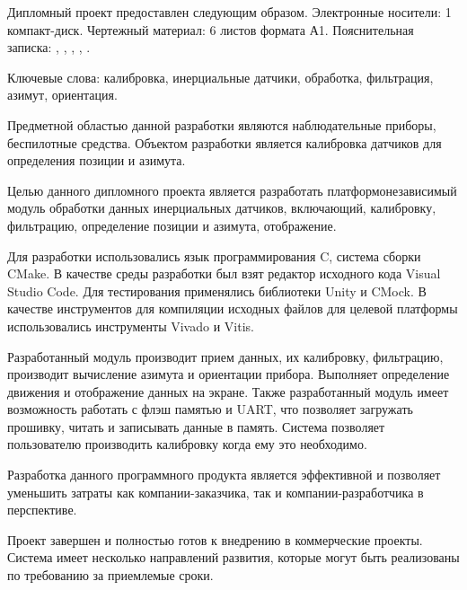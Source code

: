 
Дипломный проект предоставлен следующим образом. Электронные носители: 1
компакт-диск. Чертежный материал: 6 листов формата А1. Пояснительная записка:
\insertNumPagesText ,
\insertNumFiguresText , \insertNumTablesText ,
\insertNumBibElementsText ,
\insertNumAnnexesText .

Ключевые слова: калибровка, инерциальные датчики, обработка, фильтрация, азимут, ориентация.

Предметной областью данной разработки являются наблюдательные приборы, беспилотные средства.
Объектом разработки является калибровка датчиков для определения позиции и азимута.

Целью данного дипломного проекта является разработать платформонезависимый модуль обработки данных инерциальных датчиков, включающий, калибровку, фильтрацию, определение позиции и азимута, отображение.

Для разработки использовались язык программирования C,
система сборки CMake.
В качестве среды разработки
был взят редактор исходного кода Visual Studio Code.
Для тестирования применялись библиотеки Unity и CMock.
В качестве инструментов для компиляции исходных файлов для целевой платформы использовались инструменты Vivado и Vitis.

Разработанный модуль производит прием данных, их калибровку, фильтрацию,
производит вычисление азимута и ориентации прибора. Выполняет определение
движения и отображение данных на экране. Также разработанный модуль имеет
возможность работать с флэш памятью и UART, что позволяет загружать прошивку, читать
и записывать данные в память.
Система позволяет пользователю производить калибровку когда ему это необходимо.

Разработка данного программного продукта является эффективной
и позволяет уменьшить затраты как компании-заказчика, так и компании-разработчика в перспективе.

Проект завершен и полностью готов к внедрению в коммерческие проекты.
Система имеет несколько направлений развития, которые могут быть реализованы
по требованию за приемлемые сроки.

\newpage
